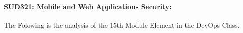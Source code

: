 \documentclass[12pt]{extreport}
\begin{document}
\begin{comment}
\subparagraph{Interpretation of the Box-plots:}
For This Element 

\begin{enumerate}	
	\item The MP Class Box-Plot:
	\begin{enumerate}
		\item MAX = a {} {} {} {} {} {} {} {} UQ = b {} {} {} {} {} {} {} {} Median = c
		\item LQ = d {} {} {} {} {} {} {} {}  MIN =	l {} {} {} {} {} {} {} {}  IQR = e - f = g
	\end{enumerate}
	\item The PSI Class Box-Plot:
	\begin{enumerate}
		\item MAX = a {} {} {} {} {} {} {} {} UQ = b {} {} {} {} {} {} {} {} Median = c
		\item LQ = d {} {} {} {} {} {} {} {}  MIN =	e {} {} {} {} {} {} {} {} IQR = f - g = h	
	\end{enumerate}
	\item The TSI Class Box-Plot:
	\begin{enumerate}
		\item MAX = a {} {} {} {} {} {} {} {} UQ = b {} {} {} {} {} {} {} {} Median = c
		\item LQ = d {} {} {} {} {} {} {} {} MIN = e {} {} {} {} {} {} {} {} IQR = f - g = h	
	\end{enumerate}
\end{enumerate}



\subparagraph{Interpretation of the histogram:}
This Frequency Distribution is (Skeness) with the following descriptive statistics:
\begin{enumerate}
	\item Mean = 
	\item STD = 
	\item Range = a - b = c
	\item IQR = a-b = c 
\end{enumerate}
\end{comment}


\paragraph{\large SUD321: Mobile and Web Applications Security:\\
}
The Folowing is the analysis of the 15th Module Element in the DevOps Class.  
\end{document}
